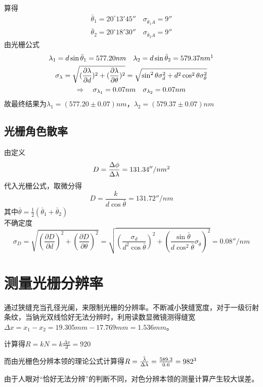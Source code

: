 \documentclass[12pt, a4paper]{ctexart}
\begin{document}
算得
\begin{gather*}
  \bar{\theta}_1 = 20^{\circ}13'45'' \quad \sigma_{\bar{\theta}_1 A} = 9''\\
  \bar{\theta}_2 = 20^{\circ}18'30'' \quad \sigma_{\bar{\theta}_2 A} = 9''
\end{gather*}
由光栅公式
\begin{gather*}
  \lambda_1 = d \sin \bar\theta_1 = 577.20 nm \quad \lambda_2 = d \sin \bar{\theta}_2 = 579.37 nm \footnotemark \\
  \sigma_{\lambda} = \sqrt{(\frac{\partial \lambda}{\partial d})^2 + (\frac{\partial \lambda}{\partial \theta})^2} = \sqrt{\sin^2 \theta \sigma_d^2 + d^2 \cos^2 \theta \sigma_{\theta}^2}\\
  \Rightarrow \quad \sigma_{\lambda_1} = 0.07 nm \quad \sigma_{\lambda_2} = 0.07 nm 
\end{gather*}
故最终结果为$\lambda_1 = (577.20 \pm 0.07) nm $，$\lambda_2 = (579.37 \pm 0.07) nm $

\subsection{光栅角色散率}

由定义
\[ D = \frac{\Delta \phi}{\Delta \lambda} = 131.34 ''/nm \footnotemark \]
代入光栅公式，取微分得
\[ D = \frac{k}{d \cos \bar{\theta}} = 131.72 ''/nm \]
其中$\bar{\theta} = \frac{1}{2}(\bar{\theta}_1 + \bar{\theta}_2)$\\
不确定度
\[ \sigma_{D} = \sqrt{(\frac{\partial D}{\partial d})^2 + (\frac{\partial D}{\partial \theta})^2} = \sqrt{(\frac{\sigma_d}{d^2 \cos \bar{\theta}})^2 + (\frac{\sin \bar{\theta}}{d \cos^2 \bar{\theta}}\sigma_{\bar{\theta}})^2 } = 0.08''/nm \]

\section{测量光栅分辨率}
通过狭缝充当孔径光阑，来限制光栅的分辨率。不断减小狭缝宽度，对于一级衍射条纹，当钠光双线恰好无法分辨时，利用读数显微镜测得缝宽$\Delta x = x_1 - x_2 = 19.305mm - 17.769mm = 1.536mm$。

计算得$R = kN = k \frac{\Delta x}{d} = 920$

而由光栅色分辨本领的理论公式计算得$R = \frac{\bar \lambda}{\Delta \lambda} = \frac{589.3}{0.6} = 982\footnotemark$

由于人眼对“恰好无法分辨”的判断不同，对色分辨本领的测量计算产生较大误差。
\end{document}
